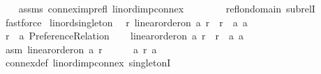 \begin{isabellebody}
%
\isadelimproof
\ \ %
\endisadelimproof
%
\isatagproof
{}\isamarkupfalse%
\ assms\ connex{\isacharunderscore}{\kern0pt}imp{\isacharunderscore}{\kern0pt}refl\ lin{\isacharunderscore}{\kern0pt}ord{\isacharunderscore}{\kern0pt}imp{\isacharunderscore}{\kern0pt}connex\isanewline
\ \ \ \ \ \ \ \ refl{\isacharunderscore}{\kern0pt}on{\isacharunderscore}{\kern0pt}domain\ subrelI\isanewline
\ \ \isamarkupfalse%
\ fastforce%
\endisatagproof
{\isafoldproof}%
%
\isadelimproof
\isanewline
%
\endisadelimproof
\isanewline
{}\isamarkupfalse%
\ lin{\isacharunderscore}{\kern0pt}ord{\isacharunderscore}{\kern0pt}singleton{\isacharcolon}{\kern0pt}\isanewline
\ \ {\isachardoublequoteopen}{\isasymforall}r{\isachardot}{\kern0pt}\ linear{\isacharunderscore}{\kern0pt}order{\isacharunderscore}{\kern0pt}on\ {\isacharbraceleft}{\kern0pt}a{\isacharbraceright}{\kern0pt}\ r\ {\isasymlongrightarrow}\ r\ {\isacharequal}{\kern0pt}\ {\isacharbraceleft}{\kern0pt}{\isacharparenleft}{\kern0pt}a{\isacharcomma}{\kern0pt}\ a{\isacharparenright}{\kern0pt}{\isacharbraceright}{\kern0pt}{\isachardoublequoteclose}\isanewline
%
\isadelimproof
%
\endisadelimproof
%
\isatagproof
{}\isamarkupfalse%
\isanewline
\ \ \isamarkupfalse%
\ r\ {\isacharcolon}{\kern0pt}{\isacharcolon}{\kern0pt}\ {\isachardoublequoteopen}{\isacharprime}{\kern0pt}a\ Preference{\isacharunderscore}{\kern0pt}Relation{\isachardoublequoteclose}\isanewline
\ \ \isamarkupfalse%
\ {\isachardoublequoteopen}linear{\isacharunderscore}{\kern0pt}order{\isacharunderscore}{\kern0pt}on\ {\isacharbraceleft}{\kern0pt}a{\isacharbraceright}{\kern0pt}\ r\ {\isasymlongrightarrow}\ r\ {\isacharequal}{\kern0pt}\ {\isacharbraceleft}{\kern0pt}{\isacharparenleft}{\kern0pt}a{\isacharcomma}{\kern0pt}\ a{\isacharparenright}{\kern0pt}{\isacharbraceright}{\kern0pt}{\isachardoublequoteclose}\isanewline
\ \ \isamarkupfalse%
\isanewline
\ \ \ \ \isamarkupfalse%
\ asm{\isacharcolon}{\kern0pt}\ {\isachardoublequoteopen}linear{\isacharunderscore}{\kern0pt}order{\isacharunderscore}{\kern0pt}on\ {\isacharbraceleft}{\kern0pt}a{\isacharbraceright}{\kern0pt}\ r{\isachardoublequoteclose}\isanewline
\ \ \ \ \isamarkupfalse%
\ {\isachardoublequoteopen}a\ {\isasympreceq}\isactrlsub r\ a{\isachardoublequoteclose}\isanewline
\ \ \ \ \ \ \isamarkupfalse%
\ connex{\isacharunderscore}{\kern0pt}def\ lin{\isacharunderscore}{\kern0pt}ord{\isacharunderscore}{\kern0pt}imp{\isacharunderscore}{\kern0pt}connex\ singletonI\isanewline

\end{isabellebody}

